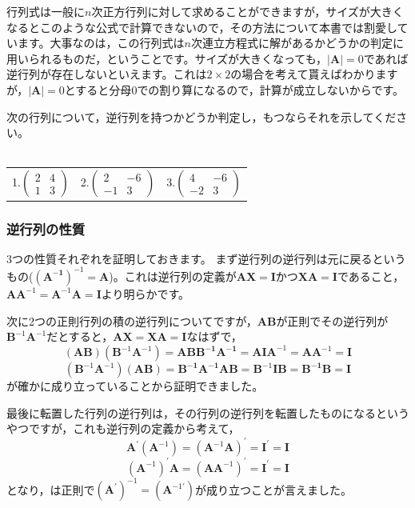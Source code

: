 \documentclass{ltjsbook}
\begin{document}
行列式は一般に$n$次正方行列に対して求めることができますが，サイズが大きくなるとこのような公式で計算できないので，その方法について本書では割愛しています。大事なのは，この行列式は$n$次連立方程式に解があるかどうかの判定に用いられるものだ，ということです。サイズが大きくなっても，$|\bm{A}|=0$であれば逆行列が存在しないといえます。これは$2 \times 2$の場合を考えて貰えばわかりますが，$|\bm{A}|=0$とすると分母$0$での割り算になるので，計算が成立しないからです。

\begin{reidai}{}{}
	次の行列について，逆行列を持つかどうか判定し，もつならそれを示してください。
	\\
	\\
	\begin{tabular}{p{3cm}p{3cm}p{3cm}}
		1.$\begin{pmatrix} 2 & 4 \\ 1 & 3\end{pmatrix}$  &
		2.$\begin{pmatrix}2 & -6 \\ -1 & 3\end{pmatrix}$ &
		3.$\begin{pmatrix}4 & -6 \\ -2 & 3\end{pmatrix}$
	\end{tabular}
\end{reidai}

\subsubsection{逆行列の性質}
3つの性質それぞれを証明しておきます。
まず逆行列の逆行列は元に戻るというもの($(\bm{A^{-1}})^{-1} = \bm{A}$)。これは逆行列の定義が$\bm{AX}= \bm{I}$かつ$\bm{XA}= \bm{I}$であること，$\bm{AA}^{-1} = \bm{A}^{-1}\bm{A} = \bm{I}$より明らかです。

次に2つの正則行列の積の逆行列についてですが，$\bm{AB}$が正則でその逆行列が$\bm{B}^{-1}\bm{A}^{-1}$だとすると，$\bm{AX} = \bm{XA} = \bm{I}$なはずで，
\[ (\bm{AB})(\bm{B}^{-1}\bm{A}^{-1}) = \bm{ABB^{-1}A^{-1}} = \bm{AIA}^{-1} = \bm{AA}^{-1}=\bm{I} \]
\[ (\bm{B}^{-1}\bm{A}^{-1})(\bm{AB}) = \bm{B^{-1}A^{-1}AB} = \bm{B}^{-1}\bm{IB} = \bm{B^{-1}B} = \bm{I} \]
が確かに成り立っていることから証明できました。

最後に転置した行列の逆行列は，その行列の逆行列を転置したものになるというやつですが，これも逆行列の定義から考えて，
\[ \bm{A}^\prime (\bm{A}^{-1}) = (\bm{A}^{-1}\bm{A})^{\prime} = \bm{I}^{\prime} = \bm{I} \]
\[ (\bm{A}^{-1})^{\prime} \bm{A} = (\bm{A} \bm{A}^{-1})^{\prime} = \bm{I}^{\prime} = \bm{I} \]
となり，は正則で$(\bm{A}^\prime )^{-1} = (\bm{A}^{-1 \prime} )$が成り立つことが言えました。
\end{document}
